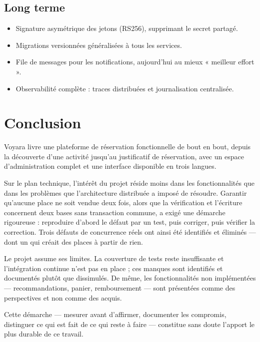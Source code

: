 \documentclass[11pt,a4paper]{report}
\begin{document}
\section{Long terme}

\begin{itemize}
  \item Signature asymétrique des jetons (RS256), supprimant le secret partagé.
  \item Migrations versionnées généralisées à tous les services.
  \item File de messages pour les notifications, aujourd'hui au mieux
    « meilleur effort ».
  \item Observabilité complète : traces distribuées et journalisation
    centralisée.
\end{itemize}

\chapter{Conclusion}

Voyara livre une plateforme de réservation fonctionnelle de bout en bout,
depuis la découverte d'une activité jusqu'au justificatif de réservation, avec
un espace d'administration complet et une interface disponible en trois langues.

Sur le plan technique, l'intérêt du projet réside moins dans les fonctionnalités
que dans les problèmes que l'architecture distribuée a imposé de résoudre.
Garantir qu'aucune place ne soit vendue deux fois, alors que la vérification et
l'écriture concernent deux bases sans transaction commune, a exigé une démarche
rigoureuse : reproduire d'abord le défaut par un test, puis corriger, puis
vérifier la correction. Trois défauts de concurrence réels ont ainsi été
identifiés et éliminés — dont un qui créait des places à partir de rien.

Le projet assume ses limites. La couverture de tests reste insuffisante et
l'intégration continue n'est pas en place ; ces manques sont identifiés et
documentés plutôt que dissimulés. De même, les fonctionnalités non implémentées
— recommandations, panier, remboursement — sont présentées comme des
perspectives et non comme des acquis.

Cette démarche — mesurer avant d'affirmer, documenter les compromis, distinguer
ce qui est fait de ce qui reste à faire — constitue sans doute l'apport le plus
durable de ce travail.
\end{document}
